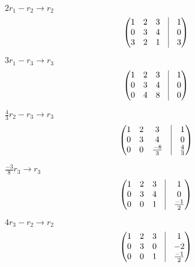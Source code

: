 \documentclass{article}
\begin{document}
\begin{enumerate}
\begin{enumerate}
\begin{enumerate}
                $2r_1 - r_2 \rightarrow r_2 $
                $$\begin{pmatrix} 1 & 2 & 3 &\vline & 1\\
                0 & 3 & 4 &\vline & 0 \\ 
                3 & 2 & 1  & \vline  & 3 \end{pmatrix}$$
                
               $3r_1 - r_3 \rightarrow r_3 $
                $$\begin{pmatrix} 1 & 2 & 3 &\vline & 1\\
                0 & 3 & 4 &\vline & 0 \\ 
                0 & 4 & 8  & \vline  & 0 \end{pmatrix}$$
                
                $\frac{4}{3}r_2 - r_3 \rightarrow r_3 $
                $$\begin{pmatrix} 1 & 2 & 3 &\vline & 1\\
                0 & 3 & 4 &\vline & 0 \\ 
                0 & 0 & \frac{-8}{3}  & \vline  & \frac{4}{3} \end{pmatrix}$$
                
                $\frac{-3}{8}r_3 \rightarrow r_3 $
                 $$\begin{pmatrix} 1 & 2 & 3 &\vline & 1\\
                0 & 3 & 4 &\vline & 0 \\ 
                0 & 0 & 1  & \vline  & \frac{-1}{2} \end{pmatrix}$$
                
                $4r_3 - r_2 \rightarrow r_2$
                 $$\begin{pmatrix} 1 & 2 & 3 &\vline & 1\\
                0 & 3 & 0 &\vline & -2 \\ 
                0 & 0 & 1  & \vline  & \frac{-1}{2} \end{pmatrix}$$
                

\end{enumerate}
\end{enumerate}
\end{enumerate}
\end{document}
